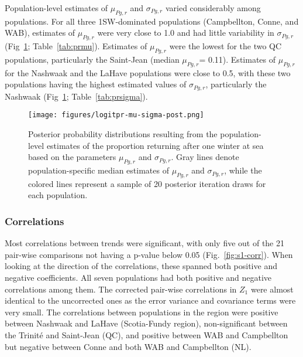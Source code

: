 \documentclass[12pt]{article}
\newcommand{\prmu}{$\mu_{Pg,r}$\xspace}
\newcommand{\prsig}{$\sigma_{Pg,r}$\xspace}
\begin{document}
Population-level estimates of \prmu and \prsig varied considerably among populations. For all
three 1SW-dominated populations (Campbellton, Conne, and WAB), estimates of \prmu
were very close to 1.0 and had little variability in \prsig (Fig~\ref{fig:prmu-post}; Table~\ref{tab:prmu}).
Estimates of \prmu were the lowest for the two QC populations, particularly the Saint-Jean (median \prmu = 0.11).
Estimates of \prmu for the Nashwaak and the LaHave populations were close to 0.5, with these two populations having 
the highest estimated values of \prsig, particularly the Nashwaak (Fig~\ref{fig:prmu-post}; Table~\ref{tab:prsigma}).







\begin{figure}[htbp] \centering
    \texttt{[image: figures/logitpr-mu-sigma-post.png]}
    \caption{Posterior probability distributions resulting from the population-level estimates of the proportion returning after one winter at sea based on
        the parameters \prmu and \prsig. Gray lines denote population-specific median estimates of \prmu and \prsig, while
       the colored lines represent a sample of 20 posterior iteration draws for each population.} 
   \label{fig:prmu-post} 
\end{figure}


\subsubsection*{Correlations}

Most correlations between trends were significant, with only five out of the
21 pair-wise comparisons not having a p-value below 0.05
(Fig.~\ref{fig:s1-corr}). When looking at the direction of the correlations,
these spanned both positive and negative coefficients. All seven populations had both
positive and negative correlations among them.
The corrected pair-wise correlations in $Z_1$ were almost identical to the
uncorrected ones as the error variance and covariance terms were very small.
The correlations between populations in the region were positive between Nashwaak and LaHave (Scotia-Fundy region), non-significant between the Trinit\'{e} and Saint-Jean (QC), and positive
between WAB and Campbellton but negative between Conne and both WAB and Campbellton (NL).
\end{document}
